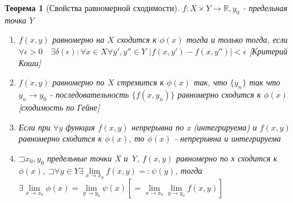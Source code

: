 \documentclass[a4paper, 12pt]{article}
\newcommand\letsymbol{\mathord{\sqsupset}}
\newtheorem{theorem}{Теорема}[section]
\theoremstyle{definition}
\theoremstyle{remark}
\begin{document}
\begin{theorem}[Свойства равномерной сходимости]
     $f:X \times Y \longrightarrow \mathbb{R}, y_0$ - предельная точка $Y$
\begin{enumerate}
     \item $f(x,y)$ равномерно на $X$ сходится к $\phi(x)$ тогда и только тогда,
      если $\forall \epsilon>0 \quad \exists \delta(\epsilon): \forall x \in X \forall y', y'' \in Y$ $|f(x, y') - f(x, y'')|<\epsilon$ [Критерий Коши]
     \item $f(x,y)$ равномерно по $X$ стремится к $\phi(x)$ так, что $\{y_n\}$ так что $y_n \longrightarrow y_0$
      - последовательность $\{f(x,y_n)\}$ равномерно сходится к $\phi(x)$ [сходимость по Гейне]
     \item Если при $\forall y$ функция $f(x,y)$ непрерывна по x (интегрируема) и $f(x,y)$ равномерно сходится к $\phi(x)$, то $\phi(x)$ -  непрерывна и интегрируема
     \item $\letsymbol x_0, y_0$ предельные точки X и Y, $f(x,y)$ равномерно по х сходится к $\phi(x)$,\hfill \break 
      $\letsymbol\forall y \in Y \exists \lim\limits_{x \to x_0}f(x,y) =: \psi(y)$, тогда $\exists \lim\limits_{x \to x_0}\phi(x) = \lim\limits_{y \to y_0}\psi(x) [= \lim\limits_{x \to x_0}\lim\limits_{y \to y_0}f(x,y)]$ 
   \end{enumerate}
\end{theorem}
\end{document}
